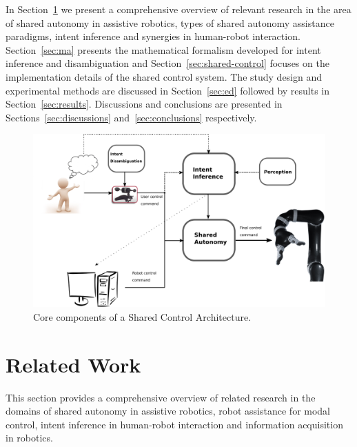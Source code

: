 In Section~\ref{sec:related-work} we present a comprehensive overview of relevant research in the area of shared autonomy in assistive robotics, types of shared autonomy assistance paradigms, intent inference and synergies in human-robot interaction. Section~\ref{sec:ma} presents the mathematical formalism developed for intent inference and disambiguation and Section~\ref{sec:shared-control} focuses on the implementation details of the shared control system. The study design and experimental methods are discussed in Section~\ref{sec:ed} followed by results in Section~\ref{sec:results}. Discussions and conclusions are presented in Sections~\ref{sec:discussions} and~\ref{sec:conclusions} respectively. 


%
\begin{figure}[t!]
	\includegraphics[keepaspectratio, width = \textwidth]{./figures/Fig2_SharedControl.eps}
	\caption{Core components of a Shared Control Architecture. }
	\label{fig:shared_control}
\end{figure}

\section{Related Work}\label{sec:related-work}
This section provides a comprehensive overview of related research in the domains of shared autonomy in assistive robotics, robot assistance for modal control, intent inference in human-robot interaction and information acquisition in robotics. 

